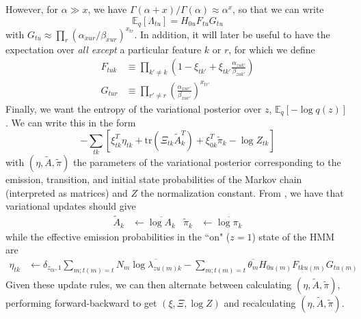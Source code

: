 \documentclass[12pt,a4paper]{article}
\begin{document}
\begin{flushleft}
However, for $\alpha \gg x$, we have $\Gamma(\alpha + x)/\Gamma(\alpha) \approx \alpha^x$, so that we can write
\begin{equation}
    \label{HFG}
    \mathbb{E}_q[\Lambda_{tu}] = H_{0u} F_{tu} G_{tu}
\end{equation}
with $G_{tu} \approx \prod_r (\alpha_{xur}/\beta_{xur})^{x_{tr}}$. In addition, it will later be useful to have the expectation over \emph{all except} a particular feature $k$ or $r$, for which we define
\begin{align}
    \label{F}
    F_{tuk} &\equiv \prod_{k'\neq k} \left(1 - \xi_{tk'} + \xi_{tk'} \frac{\alpha_{zuk'}}{\beta_{zuk'}} \right) \\
    \label{G}
    G_{tur} &\equiv \prod_{r' \neq r} \left(\frac{\alpha_{xur'}}{\beta_{xur'}} \right)^{x_{tr'}}
\end{align}
Finally, we want the entropy of the variational posterior over $z$, $\mathbb{E}_q[-\log q(z)]$. We can write this in the form
\begin{equation}
    -\sum_{tk} \left[
        \xi_{tk}^T\eta_{tk} + \text{tr}\left(\Xi_{tk} \tilde{A}_k^T \right)
        + \xi_{0k}^T\tilde{\pi}_k
        - \log Z_{tk}
    \right]
\end{equation}
with $(\eta, \tilde{A}, \tilde{\pi})$ the parameters of the variational posterior corresponding to the emission, transition, and initial state probabilities of the Markov chain (interpreted as matrices) and $Z$ the normalization constant. From \cite{beal2003variational}, we have that variational updates should give
\begin{align}
    \tilde{A}_k &\leftarrow \overline{\log A_k} &
    \tilde{\pi}_k &\leftarrow \overline{\log \pi_k}
\end{align}
while the effective emission probabilities in the ``on" ($z = 1$) state of the HMM are
\begin{align}
    \eta_{tk} &\leftarrow \delta_{z_{tk}, 1} \sum_{m; t(m) = t} N_m \overline{\log \lambda_{zu(m)k}}
    - \sum_{m; t(m) = t} \overline{\theta_m} H_{0u(m)} F_{tku(m)} G_{tu(m)}
\end{align}
Given these update rules, we can then alternate between calculating $(\eta, \tilde{A}, \tilde{\pi})$, performing forward-backward to get $(\xi, \Xi, \log Z)$ and recalculating $(\eta, \tilde{A}, \tilde{\pi})$.


\end{flushleft}
\end{document}
